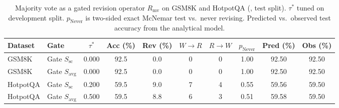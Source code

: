 \begin{table}[t]
\caption{Majority vote as a gated revision operator $R_{\text{mv}}$ on GSM8K and HotpotQA (\modelA{}, test split). $\tau^*$ tuned on development split. $p_{\text{Never}}$ is two-sided exact McNemar test vs.\ never revising. Predicted vs.\ observed test accuracy from the analytical model.}
\label{tab:mv}
\centering
\small
\setlength{\tabcolsep}{3.5pt}
\begin{tabular}{llcccccccc}
\toprule
Dataset & Gate & $\tau^*$ & Acc (\%) & Rev (\%) & $W\to R$ & $R\to W$ & $p_{\text{Never}}$ & Pred (\%) & Obs (\%) \\
\midrule
GSM8K & Gate $S_{\text{sc}}$ & 0.000 & 92.5 & 0.0 & 0 & 0 & 1.00 & 92.50 & 92.50 \\
GSM8K & Gate $S_{\text{avg}}$ & 0.000 & 92.5 & 0.0 & 0 & 0 & 1.00 & 92.50 & 92.50 \\
HotpotQA & Gate $S_{\text{sc}}$ & 0.200 & 59.5 & 9.0 & 7 & 4 & 0.55 & 59.56 & 59.50 \\
HotpotQA & Gate $S_{\text{avg}}$ & 0.500 & 59.5 & 8.8 & 6 & 3 & 0.51 & 59.58 & 59.50 \\
\bottomrule
\end{tabular}
\end{table}
